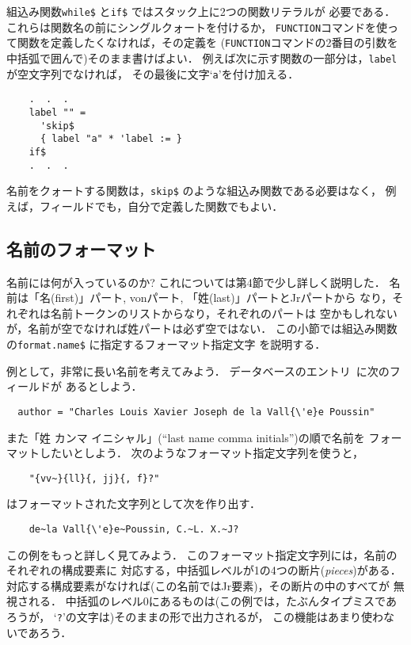 組込み関数{\tt while\$} と{\tt if\$} ではスタック上に2つの関数リテラルが
必要である．
これらは関数名の前にシングルクォートを付けるか，
{\tt FUNCTION}コマンドを使って関数を定義したくなければ，その定義を
({\tt FUNCTION}コマンドの2番目の引数を中括弧で囲んで)そのまま書けばよい．
例えば次に示す関数の一部分は，{\tt label}が空文字列でなければ，
その最後に文字`{\tt a}'を付け加える．

\begin{verbatim}
    .  .  .
    label "" =
      'skip$
      { label "a" * 'label := }
    if$
    .  .  .
\end{verbatim}

名前をクォートする関数は，{\tt skip\$} のような組込み関数である必要はなく，
例えば，フィールドでも，自分で定義した関数でもよい．


\subsection{名前のフォーマット}

名前には何が入っているのか? これについては第4節で少し詳しく説明した．
名前は「名(first)」パート, vonパート, 「姓(last)」パートとJrパートから
なり，それぞれは名前トークンのリストからなり，それぞれのパートは
空かもしれないが，名前が空でなければ姓パートは必ず空ではない．
この小節では組込み関数の{\tt format.name\$} に指定するフォーマット指定文字
を説明する．

例として，非常に長い名前を考えてみよう．
データベースのエントリ~\cite{prime-number-theorem}に次のフィールドが
あるとしよう．
\begin{verbatim}
  author = "Charles Louis Xavier Joseph de la Vall{\'e}e Poussin"
\end{verbatim}
また「姓 カンマ イニシャル」(``last name comma initials'')の順で名前を
フォーマットしたいとしよう．
次のようなフォーマット指定文字列を使うと，
\begin{verbatim}
    "{vv~}{ll}{, jj}{, f}?"
\end{verbatim}
\BibTeX はフォーマットされた文字列として次を作り出す．
\begin{verbatim}
    de~la Vall{\'e}e~Poussin, C.~L. X.~J?
\end{verbatim}

この例をもっと詳しく見てみよう．
このフォーマット指定文字列には，名前のそれぞれの構成要素に
対応する，中括弧レベルが1の4つの{\dg 断片}({\em pieces\/})がある．
対応する構成要素がなければ(この名前ではJr要素)，その断片の中のすべてが
無視される．
中括弧のレベル0にあるものは(この例では，たぶんタイプミスであろうが，
`{\tt ?}'の文字は)そのままの形で出力されるが，
この機能はあまり使わないであろう．

